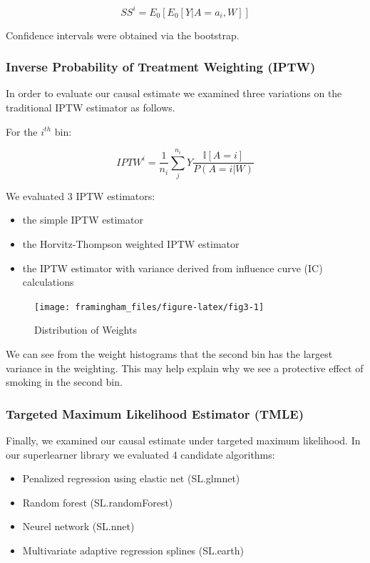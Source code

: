 \documentclass[]{article}
\begin{document}
\[ SS^{i} = E_0[E_0[Y|A=a_i,W]]\]

Confidence intervals were obtained via the bootstrap.

\subsubsection{Inverse Probability of Treatment Weighting
(IPTW)}\label{inverse-probability-of-treatment-weighting-iptw}

In order to evaluate our causal estimate we examined three variations on
the traditional IPTW estimator as follows.

For the \(i^{th}\) bin:

\[IPTW^i = \frac{1}{n_i} \sum_{j}^{n_i} Y\frac{ \mathbb{I} [A = i]}{P(A = i | W)}\]

We evaluated 3 IPTW estimators:

\begin{itemize}
\item the simple IPTW estimator
\item the Horvitz-Thompson weighted IPTW estimator 
\item the IPTW estimator with variance derived from influence curve (IC) calculations
\end{itemize}

\begin{figure}[H]

{\centering \texttt{[image: framingham\_files/figure-latex/fig3-1]} 

}

\caption{Distribution of Weights}\label{fig:fig3}
\end{figure}

We can see from the weight histograms that the second bin has the
largest variance in the weighting. This may help explain why we see a
protective effect of smoking in the second bin.

\subsubsection{Targeted Maximum Likelihood Estimator
(TMLE)}\label{targeted-maximum-likelihood-estimator-tmle}

Finally, we examined our causal estimate under targeted maximum
likelihood. In our superlearner library we evaluated 4 candidate
algorithms:

\begin{itemize}
\item Penalized regression using elastic net (SL.glmnet)
\item Random forest (SL.randomForest)
\item Neurel network (SL.nnet)
\item Multivariate adaptive regression splines (SL.earth)
\end{itemize}
\end{document}
